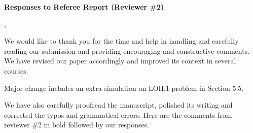 \documentclass[twoside,11pt]{article}
\begin{document}
\begin{center}
{\Large \textbf{Responses to Referee Report (Reviewer \#2)}}
\end{center}

,

We would like to thank you for the time and help in handling and carefully reading our submission and providing encouraging and constructive comments.  We have revised our paper accordingly and improved its context in several courses. 

Major change includes an extra simulation on LOH.1 problem in Section 5.5.

We have also carefully proofread the manuscript, polished its writing and corrected the typos and grammatical errors.  Here are the comments from reviewer \#2 in bold followed by our responses.
\end{document}
